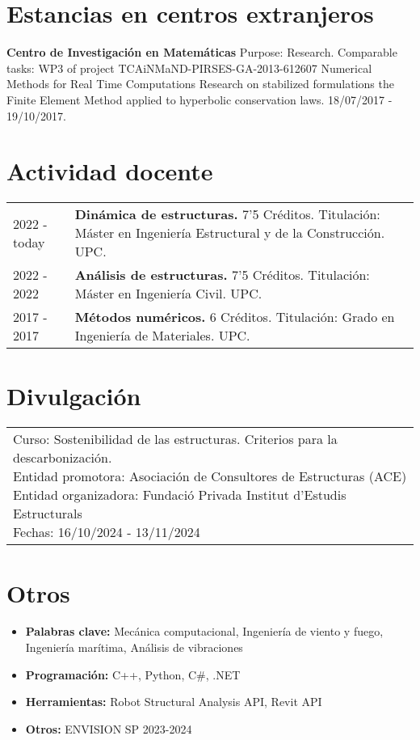 \documentclass[11pt]{article}
\begin{document}
\section{Estancias en centros extranjeros}
\textbf{Centro de Investigación en Matemáticas} Purpose: Research. Comparable tasks: WP3 of project
TCA\-iNMaND-PIRSES-GA-2013-612607 Numerical Methods for Real Time Computations Research on stabilized
formulations the Finite Element Method applied to hyperbolic conservation laws. 18/07/2017 - 19/10/2017.


\section{Actividad docente}
\begin{tabularx}{\linewidth}{lX}
    2022 - today &
    \textbf{Dinámica de estructuras.} 7'5 Créditos. Titulación: Máster en Ingeniería Estructural y de la Construcción. UPC. \\

    2022 - 2022 &
    \textbf{Análisis de estructuras.} 7'5 Créditos. Titulación: Máster en Ingeniería Civil. UPC. \\

    2017 - 2017 &
    \textbf{Métodos numéricos.} 6 Créditos. Titulación: Grado en Ingeniería de Materiales. UPC. \\
\end{tabularx}


\printbibliography[heading={bibintoc}, title={Participación en proyctos de I+D+i}, type=project]


\section{Divulgación}
\begin{tabularx}{\linewidth}{l}
    \parbox{\linewidth}{
        Curso: Sostenibilidad de las estructuras. Criterios para la descarbonización. \\
        Entidad promotora: Asociación de Consultores de Estructuras (ACE) \\
        Entidad organizadora: Fundació Privada Institut d'Estudis Estructurals \\
        Fechas: 16/10/2024 - 13/11/2024
    }
\end{tabularx}


\section{Otros}
\begin{itemize}
    \itemsep=-.3em
    \item \textbf{Palabras clave:} Mecánica computacional, Ingeniería de viento y fuego, Ingeniería marítima, Análisis de vibraciones
    \item \textbf{Programación:} C++, Python, C\#, .NET
    \item \textbf{Herramientas:} Robot Structural Analysis API, Revit API
    \item \textbf{Otros:} ENVISION SP 2023-2024
\end{itemize}
\end{document}

